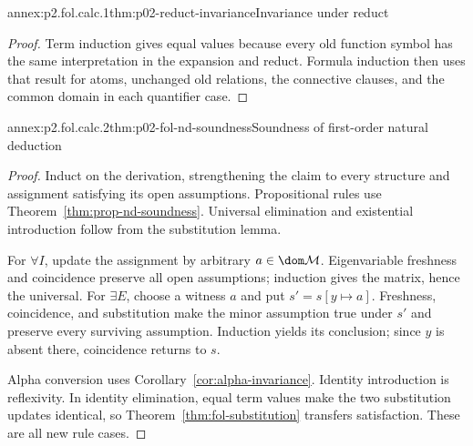 
\begin{annexitem}{annex:p2.fol.calc.1}{thm:p02-reduct-invariance}{Invariance under reduct}
\begin{proof}
Term induction gives equal values because every old function symbol has the
same interpretation in the expansion and reduct.  Formula induction then
uses that result for atoms, unchanged old relations, the connective clauses,
and the common domain in each quantifier case.
\end{proof}
\end{annexitem}

\begin{annexitem}{annex:p2.fol.calc.2}{thm:p02-fol-nd-soundness}{Soundness of first-order natural deduction}
\begin{proof}
Induct on the derivation, strengthening the claim to every structure and
assignment satisfying its open assumptions.  Propositional rules use
Theorem~\ref{thm:prop-nd-soundness}.  Universal elimination and existential
introduction follow from the substitution lemma.

For \(\forall I\), update the assignment by arbitrary
\(a\in\dom\mathcal M\).  Eigenvariable freshness and coincidence preserve
all open assumptions; induction gives the matrix, hence the universal.
For \(\exists E\), choose a witness \(a\) and put
\(s'=s[y\mapsto a]\).  Freshness, coincidence, and substitution make the
minor assumption true under \(s'\) and preserve every surviving assumption.
Induction yields its conclusion; since \(y\) is absent there, coincidence
returns to \(s\).

Alpha conversion uses Corollary~\ref{cor:alpha-invariance}.
Identity introduction is reflexivity.  In identity elimination, equal term
values make the two substitution updates identical, so
Theorem~\ref{thm:fol-substitution} transfers satisfaction.  These are all
new rule cases.
\end{proof}
\end{annexitem}

